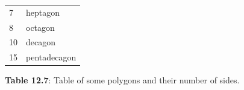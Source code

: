 {\begin{center}
\begin{xtabular*}{\mytablewidth}[t]{|p{10\mystarwidth}|p{10\mystarwidth}|}
    
        7 &
    
    
        heptagon%
     \tabularnewline{}
    
    
        8 &
    
    
        octagon%
     \tabularnewline{}
    
    
        10 &
    
    
        decagon%
     \tabularnewline{}
    
    
        15 &
    
    
        pentadecagon%
     \tabularnewline{}
    \end{xtabular*}
      \end{center}
    \begin{center}{\small\bfseries Table 12.7}: Table of some polygons and their number of sides.\end{center}
    
}
